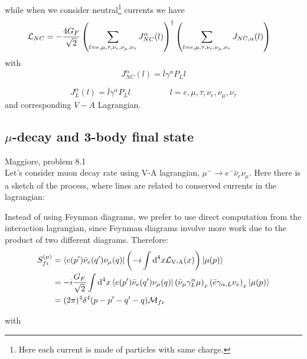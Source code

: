 \documentclass[TheoreticalPhy_ModB.tex]{subfiles}
\begin{document}
while when we consider neutral\footnote{Here each current is made of particles with same charge.} currents we have
\begin{align*}
\mathcal L_{NC}
&=-\frac{4G_F}{\sqrt2}\left(\sum_{l=e,\mu,\tau,\nu_e,\nu_\mu,\nu_\tau}J_{NC}^{\alpha}(l)\right)^\dagger\left(\sum_{l=e,\mu,\tau,\nu_e,\nu_\mu,\nu_\tau}J_{NC,\alpha}(l)\right)
\end{align*}
with
\begin{equation}\label{eqn:neutral-current-VA}
J_{NC}^{\alpha}(l)=\bar l\gamma^\alpha P_Ll
\end{equation}

\begin{equation}\label{eqn:neutral-current-VA}
J_L^{\alpha}(l)=\bar l\gamma^\alpha P_Ll\hspace{2cm} l=e,\mu,\tau,\nu_e,\nu_\mu,\nu_\tau
\end{equation}
and corresponding $V-A$ Lagrangian.

\subsection{$\mu$-decay and 3-body final state}
\textsf{Maggiore, problem 8.1}\\

Let's consider muon decay rate using V-A lagrangian, $\mu^-\to e^-\bar \nu_e\nu_\mu$. Here there is a sketch of the process, where lines are related to conserved currents in the lagrangian:

\begin{figure}[H]
\centering

\end{figure}

Instead of using Feynman diagrams, we prefer to use direct computation from the interaction lagrangian, since Feynman diagrams involve more work due to the product of two different diagrams. Therefore:
\begin{align*}
S_{fi}^{(\mu)}
&=\bra{e(p')\bar\nu_e(q')\nu_\mu(q)}\left(-i\int\textup{d}^4x\mathcal L_{\text{V-A}}(x)\right)\ket{\mu(p)}\\
&=-i\frac{G_F}{\sqrt2}\int\textup{d}^4x\bra{e(p')\bar\nu_e(q')\nu_\mu(q)}\left(\bar \nu_\mu\gamma^\alpha_L\mu\right)_x\left(\bar e \gamma_{\alpha,L}\nu_e\right)_x\ket{\mu(p)}\\
&=(2\pi)^4\delta^4(p-p'-q'-q)\mathcal M_{fi}
\end{align*}

with
\end{document}
